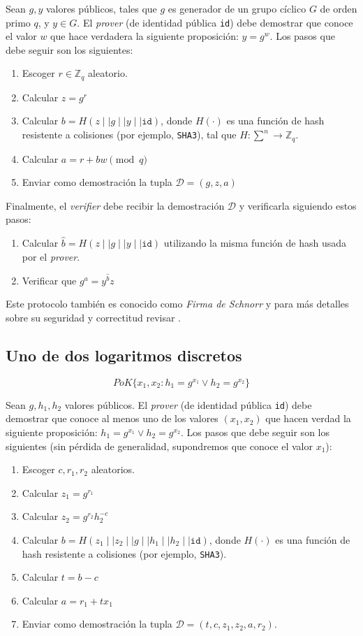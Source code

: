 Sean $g, y$ valores públicos, tales que $g$ es generador de un grupo cíclico $G$ de orden primo $q$, y 
$y \in G$. 
El \emph{prover} (de identidad pública 
\texttt{id}) debe demostrar que conoce el valor $w$ que hace verdadera la 
siguiente proposición: $y = g^w$. Los pasos que debe seguir son los siguientes:
\begin{enumerate}
	\item Escoger $r \in \mathbb{Z}_q$ aleatorio.
	\item Calcular $z = g^r$
	\item Calcular $b = H(z \mid\mid g \mid\mid y \mid\mid \mathtt{id})$, 
	donde $H(\cdot)$ es una función de hash resistente a colisiones (por ejemplo, 
	\texttt{SHA3}), tal que $H: \sum^{n} \rightarrow \mathbb{Z}_q$.
	\item Calcular $a = r + bw \pmod q$
	\item Enviar como demostración la tupla $\mathcal{D} = (g, z, a)$
\end{enumerate}

Finalmente, el \emph{verifier} debe recibir la demostración $\mathcal{D}$ y 
verificarla siguiendo estos pasos:
\begin{enumerate}
	\item Calcular $\hat{b} = H(z \mid\mid g \mid\mid y \mid\mid \mathtt{id})$ 
	utilizando la misma función de hash usada por el \emph{prover}.
	\item Verificar que $g^a = y^{\hat{b}} z$
\end{enumerate} 

Este protocolo también es conocido como \emph{Firma de Schnorr} y para más detalles 
sobre su seguridad y correctitud revisar \cite{schnorr1989efficient}.

\subsection{Uno de dos logaritmos discretos}

$$PoK\{x_1, x_2 : h_1 = g^{x_1} \lor h_2 = g^{x_2}\}$$

Sean $g,h_1,h_2$ valores públicos. El \emph{prover} (de identidad pública 
\texttt{id}) debe demostrar que conoce al menos uno de los valores $(x_1,x_2)$ 
que hacen verdad la siguiente proposición: $h_1 = g^{x_1} \lor h_2 = g^{x_2}$. 
Los pasos que debe seguir son los siguientes (sin pérdida de generalidad, 
supondremos que conoce el valor $x_1$):
\begin{enumerate}
	\item Escoger $c, r_1, r_2$ aleatorios.
	\item Calcular $z_1 = g^{r_1}$
	\item Calcular $z_2 = g^{r_2} h_2^{-c}$
	\item Calcular $b = H(z_1 \mid\mid z_2 \mid\mid g \mid\mid h_1 \mid\mid h_2 \mid\mid \mathtt{id})$, donde $H(\cdot)$ es una función de hash resistente a colisiones (por ejemplo, \texttt{SHA3}).
	\item Calcular $t = b - c$
	\item Calcular $a = r_1 + t x_1$
	\item Enviar como demostración la tupla $\mathcal{D} = (t, c, z_1, z_2, a, r_2)$.
\end{enumerate}

